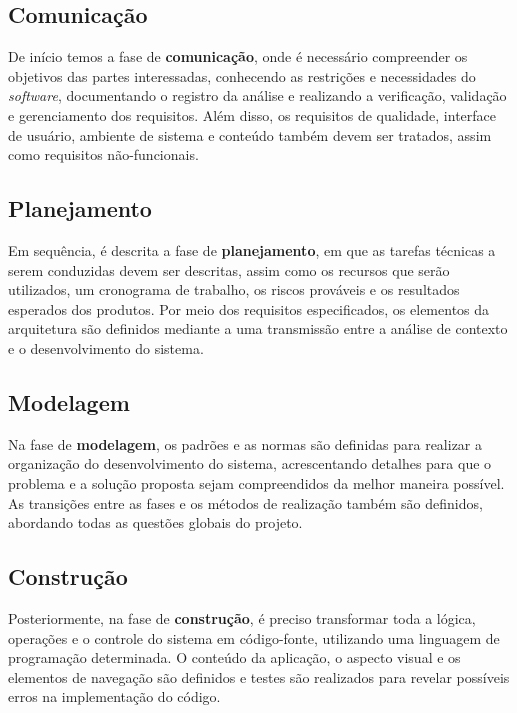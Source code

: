 \subsection{Comunicação}
\label{sec-ref-comunicacao}

De início temos a fase de \textbf{comunicação}, onde é necessário compreender os objetivos das partes interessadas, conhecendo as restrições e necessidades do \textit{software}, documentando o registro da análise e realizando a verificação, validação e gerenciamento dos requisitos. Além disso, os requisitos de qualidade, interface de usuário, ambiente de sistema e conteúdo também devem ser tratados, assim como requisitos não-funcionais.

\subsection{Planejamento}
\label{sec-ref-planejamento}

Em sequência, é descrita a fase de \textbf{planejamento}, em que as tarefas técnicas a serem conduzidas devem ser descritas, assim como os recursos que serão utilizados, um cronograma de trabalho, os riscos prováveis e os resultados esperados dos produtos. Por meio dos requisitos especificados, os elementos da arquitetura são definidos mediante a uma transmissão entre a análise de contexto e o desenvolvimento do sistema.

\subsection{Modelagem}
\label{sec-ref-modelagem}

Na fase de \textbf{modelagem}, os padrões e as normas são definidas para realizar a organização do desenvolvimento do sistema, acrescentando detalhes para que o problema e a solução proposta sejam compreendidos da melhor maneira possível. As transições entre as fases e os métodos de realização também são definidos, abordando todas as questões globais do projeto.   

\subsection{Construção}
\label{sec-ref-construcao}

Posteriormente, na fase de \textbf{construção}, é preciso transformar toda a lógica, operações e o controle do sistema em código-fonte, utilizando uma linguagem de programação determinada. O conteúdo da aplicação, o aspecto visual e os elementos de navegação são definidos e testes são realizados para revelar possíveis erros na implementação do código. 

